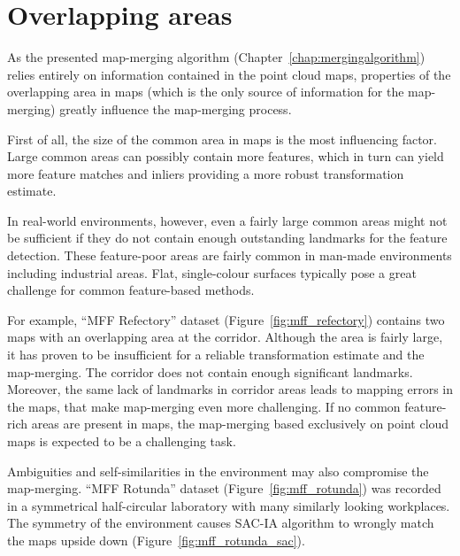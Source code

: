 \section{Overlapping areas}
\label{sec:mff-evaluation}

As the presented map-merging algorithm (Chapter~\ref{chap:mergingalgorithm}) relies entirely on information contained in the point cloud maps, properties of the overlapping area in maps (which is the only source of information for the map-merging) greatly influence the map-merging process.

First of all, the size of the common area in maps is the most influencing factor. Large common areas can possibly contain more features, which in turn can yield more feature matches and inliers providing a more robust transformation estimate.

In real-world environments, however, even a fairly large common areas might not be sufficient if they do not contain enough outstanding landmarks for the feature detection. These feature-poor areas are fairly common in man-made environments including industrial areas. Flat, single-colour surfaces typically pose a great challenge for common feature-based methods.

For example, ``MFF Refectory'' dataset (Figure~\ref{fig:mff_refectory}) contains two maps with an overlapping area at the corridor. Although the area is fairly large, it has proven to be insufficient for a reliable transformation estimate and the map-merging. The corridor does not contain enough significant landmarks. Moreover, the same lack of landmarks in corridor areas leads to mapping errors in the maps, that make map-merging even more challenging. If no common feature-rich areas are present in maps, the map-merging based exclusively on point cloud maps is expected to be a challenging task.

Ambiguities and self-similarities in the environment may also compromise the map-merging. ``MFF Rotunda'' dataset (Figure~\ref{fig:mff_rotunda}) was recorded in a symmetrical half-circular laboratory with many similarly looking workplaces. The symmetry of the environment causes \gls{SAC-IA} algorithm to wrongly match the maps upside down (Figure~\ref{fig:mff_rotunda_sac}).

